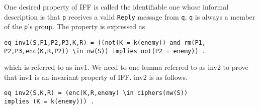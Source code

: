 \documentclass[a4paper,fleqn]{cas-dc}
\begin{document}
One desired property of IFF is called the identifiable one whose informal description is that \verb!p! receives a valid \verb!Reply! message from \verb!q!, \verb!q! is always a member of the \verb!p!'s group. The property is expressed as 
\begin{verbatim}
eq inv1(S,P1,P2,P3,K,R) = ((not(K = k(enemy)) and rm(P1,
P2,P3,enc(K,R,P2)) \in nw(S)) implies not(P2 = enemy)) .
\end{verbatim}
which is referred to as inv1. We need to one lemma referred to as inv2 to prove that inv1 is an invariant property of IFF. inv2 is as follows.
\begin{verbatim}
eq inv2(S,K,R) = (enc(K,R,enemy) \in ciphers(nw(S)) 
implies (K = k(enemy))) .
\end{verbatim}
\end{document}
